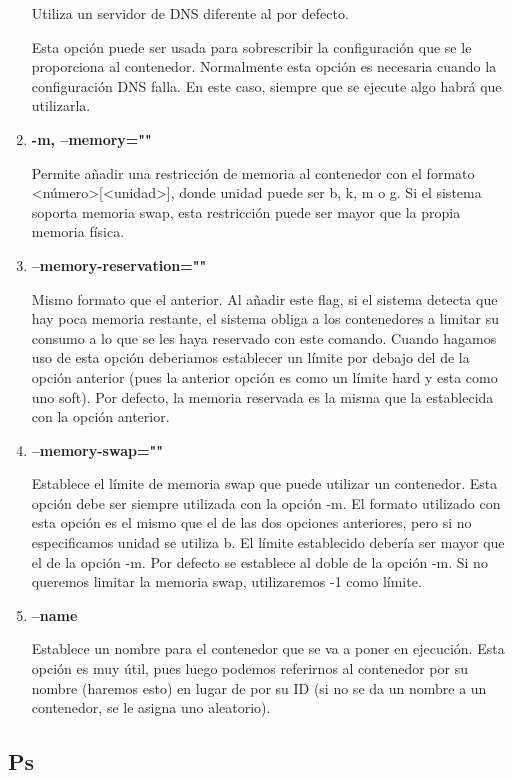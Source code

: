 \documentclass[]{article}
\begin{document}
\begin{enumerate}
			Utiliza un servidor de DNS diferente al por defecto.
	
			Esta opción puede ser usada para sobrescribir la configuración que se le proporciona al contenedor.
			Normalmente esta opción es necesaria cuando la configuración DNS falla. En este caso, siempre que se ejecute algo habrá que utilizarla.
	
\item {\bf -m, --memory=""}
	
			Permite añadir una restricción de memoria al contenedor con el formato <número>[<unidad>], donde unidad puede ser b, k, m o g.
			Si el sistema soporta memoria swap, esta restricción puede ser mayor que la propia memoria física.
	
\item {\bf --memory-reservation=""}
	
			Mismo formato que el anterior.
			Al añadir este flag, si el sistema detecta que hay poca memoria restante, el sistema obliga a los contenedores a limitar su consumo a
			lo que se les haya reservado con este comando.
			Cuando hagamos uso de esta opción deberiamos establecer un límite por debajo del de la opción anterior (pues la anterior opción es como
			un límite hard y esta como uno soft). Por defecto, la memoria reservada es la misma que la establecida con la opción anterior.
	
\item {\bf --memory-swap=""}
	
			Establece el límite de memoria swap que puede utilizar un contenedor. Esta opción debe ser siempre utilizada con la opción -m.
			El formato utilizado con esta opción es el mismo que el de las dos opciones anteriores, pero si no especificamos unidad se utiliza b.
			El límite establecido debería ser mayor que el de la opción -m.
			Por defecto se establece al doble de la opción -m.
			Si no queremos limitar la memoria swap, utilizaremos -1 como límite.
	
\item {\bf --name}
	
			Establece un nombre para el contenedor que se va a poner en ejecución. Esta opción es muy útil, pues luego podemos referirnos al contenedor por su nombre (haremos esto) en lugar de por su ID
			(si no se da un nombre a un contenedor, se le asigna uno aleatorio).

\end{enumerate}

\subsection{Ps}
\end{document}
